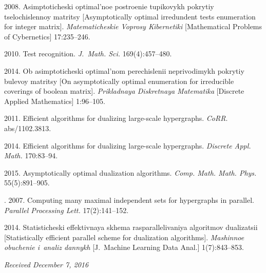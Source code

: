 \begin{multicols}{2}
{{\begin{thebibliography}{99}
 2008.
Asimptoticheski optimal'noe postroenie tupikovykh pokrytiy
    tselochislennoy matritsy [Asymptotically optimal irredundent tests 
    enumeration for integer matrix].
\textit{Matematicheskie Voprosy Kibernetiki} 
[Mathematical Problems of Cybernetics] 17:235--246.
    
    
    
2010.
Test recognition.
\textit{J.~Math. Sci.} 169(4):457--480.

2014.
Ob asimpto\-ti\-cheski optimal'nom perechislenii neprivodimykh pokrytiy bulevoy matritsy
[On asymptotically optimal enumeration for irreducible coverings of
    boolean matrix].
\textit{Prikladnaya Diskretnaya Matematika} [Discrete Applied Mathematics] 
1:96--105.

    
 2011.
 Efficient algorithms for dualizing large-scale hypergraphs.
\textit{CoRR}. abs/1102.3813.
    
 2014.
 Efficient algorithms for dualizing large-scale hypergraphs.
\textit{Discrete Appl. Math.} 170:83--94.
    
 2015.
Asymptotically optimal dualization algorithms.
\textit{Comp. Math. Math. Phys.} 55(5):891--905.
    
    . 
2007.
Computing many maximal independent sets for hypergraphs in
    parallel.
\textit{Parallel Processing Lett.} 17(2):141--152.
    
2014.
 Sta\-ti\-sti\-cheski effektivnaya skhema rasparallelivaniya algoritmov dualizatsii 
 [Statistically efficient parallel scheme for dualization algorithms].
\textit{Mashinnoe obuchenie i~analiz dannykh} [J.~Machine Learning Data Anal.]
    1(7):843--853.
    \end{thebibliography} } }

\end{multicols}

\vspace*{-6pt}

\hfill{\small\textit{Received December 7, 2016}}



